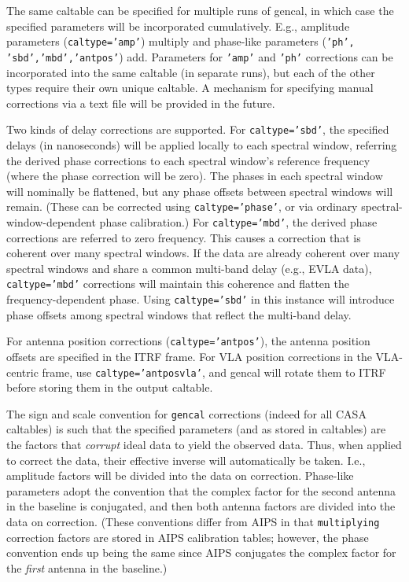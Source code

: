 The same caltable can be specified for multiple runs of gencal, in
which case the specified parameters will be incorporated cumulatively.
E.g., amplitude parameters ({\tt caltype='amp'}) multiply and
phase-like parameters ({\tt 'ph', 'sbd','mbd','antpos'}) add.
Parameters for {\tt 'amp'} and {\tt 'ph'} corrections can be
incorporated into the same caltable (in separate runs), but each of
the other types require their own unique caltable.  A mechanism for
specifying manual corrections via a text file will be provided in the
future.

Two kinds of delay corrections are supported.  For {\tt caltype='sbd'},
the specified delays (in nanoseconds) will be applied locally to 
each spectral window, referring the derived phase corrections to
each spectral window's reference frequency (where the phase correction
will be zero).  The phases in each spectral window will nominally be
flattened, but any phase offsets between spectral windows will remain.
(These can be corrected using {\tt caltype='phase'}, or via ordinary
spectral-window-dependent phase calibration.)  For {\tt caltype='mbd'},
the derived phase corrections are referred to zero frequency.  This
causes a correction that is coherent over many spectral windows. 
If the data are already coherent over many spectral windows and share
a common multi-band delay (e.g., EVLA data), {\tt caltype='mbd'} 
corrections will maintain this coherence and flatten the 
frequency-dependent phase.  Using {\tt caltype='sbd'} in this instance
will introduce phase offsets among spectral windows that reflect
the multi-band delay.  

For antenna position corrections ({\tt caltype='antpos'}), the antenna
position offsets are specified in the ITRF frame.  For VLA position
corrections in the VLA-centric frame, use {\tt caltype='antposvla'},
and gencal will rotate them to ITRF before storing them in the output
caltable.

The sign and scale convention for {\tt gencal} corrections (indeed for
all CASA caltables) is such that the specified parameters (and as
stored in caltables) are the factors that {\em corrupt} ideal data to
yield the observed data.  Thus, when applied to correct the data,
their effective inverse will automatically be taken.  I.e., amplitude
factors will be divided into the data on correction.  Phase-like
parameters adopt the convention that the complex factor for the second
antenna in the baseline is conjugated, and then both antenna factors
are divided into the data on correction.  (These conventions differ
from AIPS in that {\tt multiplying} correction factors are stored in
AIPS calibration tables; however, the phase convention ends up being
the same since AIPS conjugates the complex factor for the {\em first}
antenna in the baseline.)

